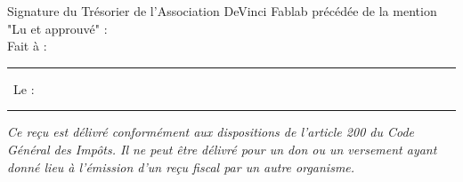 \documentclass[11pt,a4paper]{article}
\begin{document}
\vspace{1cm}



\vspace{\fill}
\begin{flushright}
    \begin{minipage}[t]{0.5\textwidth}
        \begin{framed}
            Signature du Trésorier de l'Association DeVinci Fablab précédée de la mention "Lu et approuvé" :
            \vspace{2.5cm} \\
            Fait à : \rule{3cm}{0.75pt} \
            Le : \rule{3cm}{0.75pt}
        \end{framed}
    \end{minipage}
\end{flushright}

\vspace{0.5cm}
\textit{\footnotesize Ce reçu est délivré conformément aux dispositions de l'article 200 du Code Général des Impôts. Il ne peut être délivré pour un don ou un versement ayant donné lieu à l'émission d'un reçu fiscal par un autre organisme.}
\end{document}
